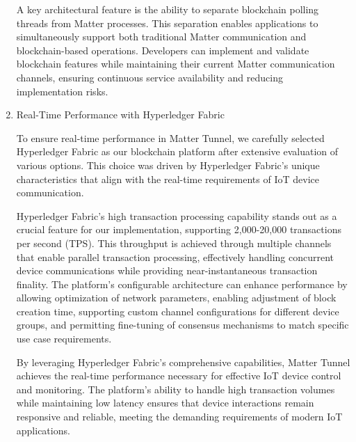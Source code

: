 \documentclass[conference]{IEEEtran}
\begin{document}
\begin{enumerate}[itemsep=2ex, parsep=1ex]
			A key architectural feature is the ability to separate blockchain polling
			threads from Matter processes. This separation enables applications to simultaneously
			support both traditional Matter communication and blockchain-based operations.
			Developers can implement and validate blockchain features while
			maintaining their current Matter communication channels, ensuring continuous
			service availability and reducing implementation risks.

		\item Real-Time Performance with Hyperledger Fabric

			To ensure real-time performance in Matter Tunnel, we carefully selected Hyperledger
			Fabric as our blockchain platform after extensive evaluation of various options.
			This choice was driven by Hyperledger Fabric's unique characteristics that
			align with the real-time requirements of IoT device communication.

			Hyperledger Fabric's high transaction processing capability stands out as
			a crucial feature for our implementation, supporting 2,000-20,000 transactions
			per second (TPS). This throughput is achieved through multiple channels
			that enable parallel transaction processing, effectively handling concurrent
			device communications while providing near-instantaneous transaction finality.
			The platform's configurable architecture can enhance performance by
			allowing optimization of network parameters, enabling adjustment of block creation
			time, supporting custom channel configurations for different device groups,
			and permitting fine-tuning of consensus mechanisms to match specific use case
			requirements.

			By leveraging Hyperledger Fabric's comprehensive capabilities, Matter
			Tunnel achieves the real-time performance necessary for effective IoT
			device control and monitoring. The platform's ability to handle high transaction
			volumes while maintaining low latency ensures that device interactions remain
			responsive and reliable, meeting the demanding requirements of modern IoT
			applications.
	\end{enumerate}
\end{document}
